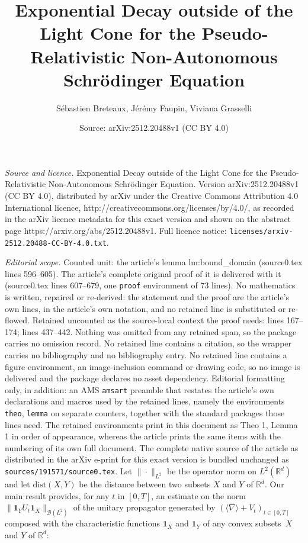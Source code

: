 \documentclass[10pt,a4paper]{amsart}
\title{Exponential Decay outside of the Light Cone for the Pseudo-Relativistic Non-Autonomous Schrödinger Equation}
\author{S\'ebastien Breteaux, J\'er\'emy Faupin, Viviana Grasselli}
\date{Source: arXiv:2512.20488v1 (CC BY 4.0)}
\newcommand{\jnabla}{{\langle\nabla\rangle}}
\begin{document}
\maketitle

\noindent\emph{Source and licence.} Exponential Decay outside of the Light Cone for the Pseudo-Relativistic Non-Autonomous Schrödinger Equation. Version arXiv:2512.20488v1 (CC BY 4.0), distributed by arXiv under the Creative Commons Attribution 4.0 International licence, http://creativecommons.org/licenses/by/4.0/, as recorded in the arXiv licence metadata for this exact version and shown on the abstract page https://arxiv.org/abs/2512.20488v1. Full licence notice: \texttt{licenses/arxiv-2512.20488-CC-BY-4.0.txt}.\par\smallskip

\noindent\textit{Editorial scope.} Counted unit: the article's lemma lm:bound\_domain (source0.tex lines 596--605). The article's complete original proof of it is delivered with it (source0.tex lines 607--679, one \texttt{proof} environment of 73 lines). No mathematics is written, repaired or re-derived: the statement and the proof are the article's own lines, in the article's own notation, and no retained line is substituted or re-flowed.  Retained uncounted as the source-local context the proof needs: lines 167--174; lines 437--442.  Nothing was omitted from any retained span, so the package carries no omission record.  No retained line contains a citation, so the wrapper carries no bibliography and no bibliography entry.  No retained line contains a figure environment, an image-inclusion command or drawing code, so no image is delivered and the package declares no asset dependency.  Editorial formatting only, in addition: an AMS \texttt{amsart} preamble that restates the article's own declarations and macros used by the retained lines, namely the environments \texttt{theo}, \texttt{lemma} on separate counters, together with the standard packages those lines need.  The retained environments print in this document as Theo 1, Lemma 1 in order of appearance, whereas the article prints the same items with the numbering of its own full document.  The complete native source of the article as distributed in the arXiv e-print for this exact version is bundled unchanged as \texttt{sources/191571/source0.tex}.
Let $\|\cdot\|_{L^2}$ be the operator norm on $L^2(\mathbb{R}^d)$ and let $\mathrm{dist}(X,Y)$ be the distance between two subsets $X$ and $Y$ of $\mathbb{R}^d$.  Our main result provides, for any $t$ in $[0,T]$, an estimate on the norm $\|\mathbf{1}_YU_t\mathbf{1}_X\|_{\mathcal{B}(L^2)}$ of the unitary propagator generated by $(\jnabla+V_t)_{t\in[0,T]}$ composed with the characteristic functions $\mathbf{1}_X$ and $\mathbf{1}_Y$ of any convex subsets~$X$ and $Y$ of $\mathbb{R}^d$:
\end{document}
